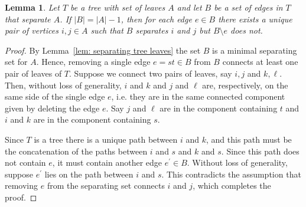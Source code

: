 \documentclass[11pt]{article}
\newtheorem{lemm}[theo]{Lemma}
\theoremstyle{definition}
\numberwithin{equation}{section}
\begin{document}
\begin{lemm}
    \label{lem: unique pair}
    Let $T$ be a tree with set of leaves $A$ and let $B$ be a set of edges in $T$ that separate $A$.  If $|B| = |A|-1$, then for each edge $e\in B$ there exists a unique pair of vertices $i,j\in A$ such that $B$ separates $i$ and $j$ but $B\setminus e$ does not. 
\end{lemm}

\begin{proof}
By Lemma~\ref{lem: separating tree leaves} the set $B$ is a minimal separating set for $A$. 
Hence, removing a single edge $e = st\in B$ from $B$ connects at least one pair of leaves of $T$. 
Suppose we connect two pairs of leaves, say $i,j$ and $k, \ell$. 
Then, without loss of generality, $i$ and $k$ and $j$ and $\ell$ are, respectively, on the same side of the single edge $e$, i.e. they are in the same connected component given by deleting the edge $e$. 
Say $j$ and $\ell$ are in the component containing $t$ and $i$ and $k$ are in the component containing $s$. 

Since $T$ is a tree there is a unique path between $i$ and $k$, and this path must be the concatenation of the paths between $i$ and $s$ and $k$ and $s$.  
Since this path does not contain $e$, it must contain another edge $e^\prime\in B$. 
Without loss of generality, suppose $e^\prime$ lies on the path between $i$ and $s$. 
This contradicts the assumption that removing $e$ from the separating set connects $i$ and $j$, which completes the proof. 
\end{proof}
\end{document}

